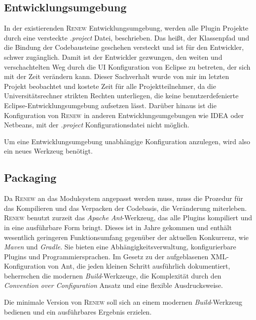 \subsection{Entwicklungsumgebung} 
	In der existierenden \textsc{Renew} Entwicklungsumgebung, werden alle Plugin Projekte durch eine versteckte \textit{.project} Datei, beschrieben. Das heißt, der Klassenpfad und die Bindung der Codebausteine geschehen versteckt und ist für den Entwickler, schwer zugänglich. Damit ist der Entwickler gezwungen, den weiten und verschachtelten Weg durch die UI Konfiguration von Eclipse zu betreten, der sich mit der Zeit verändern kann. Dieser Sachverhalt wurde von mir im letzten Projekt beobachtet und kostete Zeit für alle Projektteilnehmer, da die Universitätsrechner strikten Rechten unterliegen, die keine benutzerdefenierte Eclipse-Entwicklungsumgebung aufsetzen lässt. Darüber hinaus ist die Konfiguration von \textsc{Renew} in anderen Entwicklungsumgebungen wie IDEA oder Netbeans, mit der \textit{.project} Konfigurationsdatei nicht möglich. \bigbreak

	Um eine Entwicklungsumgebung unabhängige Konfiguration anzulegen, wird also ein neues Werkzeug benötigt. 

\subsection{Packaging}
	Da \textsc{Renew} an das Modulsystem angepasst werden muss, muss die Prozedur für das Kompilieren und das Verpacken der Codebasis, die Veränderung miterleben.\newline
	\textsc{Renew} benutzt zurzeit das \textit{Apache Ant}-Werkzeug, das alle Plugins kompiliert und in eine ausführbare Form bringt. Dieses ist in Jahre gekommen und enthält wesentlich geringeren Funktionsumfang gegenüber der aktuellen Konkurrenz, wie \textit{Maven} und \textit{Gradle}. Sie bieten eine Abhängigkeitsverwaltung, konfigurierbare Plugins und Programmiersprachen. Im Gesetz zu der aufgeblasenen XML-Konfiguration von Ant, die jeden kleinen Schritt ausführlich dokumentiert, beherrschen die modernen \textit{Build}-Werkzeuge, die Komplexität durch den \textit{Convention over Configuration} Ansatz und eine flexible Ausdrucksweise. \bigbreak

	Die minimale Version von \textsc{Renew} soll sich an einem modernen \textit{Build}-Werkzeug bedienen und ein ausführbares Ergebnis erzielen.

